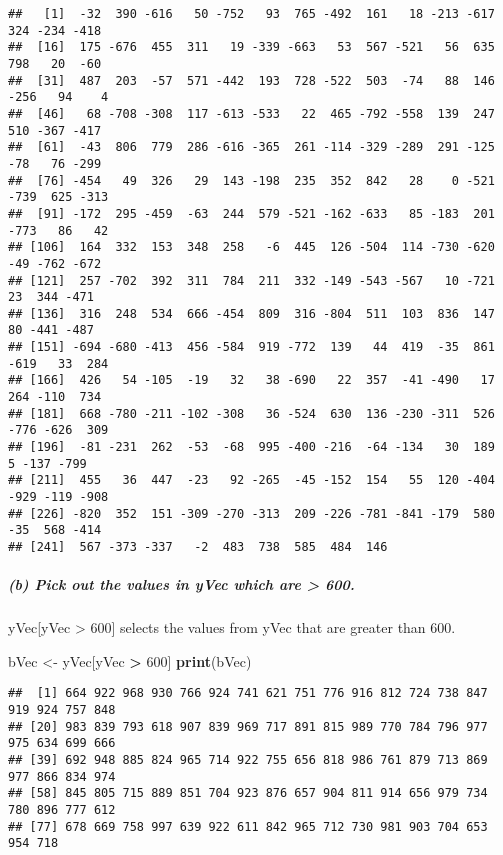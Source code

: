 \documentclass[
]{article}
\newenvironment{Shaded}{\begin{snugshade}}{\end{snugshade}}
\newcommand{\DecValTok}[1]{\textcolor[rgb]{0.00,0.00,0.81}{#1}}
\newcommand{\FunctionTok}[1]{\textcolor[rgb]{0.13,0.29,0.53}{\textbf{#1}}}
\newcommand{\NormalTok}[1]{#1}
\newcommand{\OtherTok}[1]{\textcolor[rgb]{0.56,0.35,0.01}{#1}}
\newcommand{\SpecialCharTok}[1]{\textcolor[rgb]{0.81,0.36,0.00}{\textbf{#1}}}
\begin{document}
\begin{verbatim}
##   [1]  -32  390 -616   50 -752   93  765 -492  161   18 -213 -617  324 -234 -418
##  [16]  175 -676  455  311   19 -339 -663   53  567 -521   56  635  798   20  -60
##  [31]  487  203  -57  571 -442  193  728 -522  503  -74   88  146 -256   94    4
##  [46]   68 -708 -308  117 -613 -533   22  465 -792 -558  139  247  510 -367 -417
##  [61]  -43  806  779  286 -616 -365  261 -114 -329 -289  291 -125  -78   76 -299
##  [76] -454   49  326   29  143 -198  235  352  842   28    0 -521 -739  625 -313
##  [91] -172  295 -459  -63  244  579 -521 -162 -633   85 -183  201 -773   86   42
## [106]  164  332  153  348  258   -6  445  126 -504  114 -730 -620  -49 -762 -672
## [121]  257 -702  392  311  784  211  332 -149 -543 -567   10 -721   23  344 -471
## [136]  316  248  534  666 -454  809  316 -804  511  103  836  147   80 -441 -487
## [151] -694 -680 -413  456 -584  919 -772  139   44  419  -35  861 -619   33  284
## [166]  426   54 -105  -19   32   38 -690   22  357  -41 -490   17  264 -110  734
## [181]  668 -780 -211 -102 -308   36 -524  630  136 -230 -311  526 -776 -626  309
## [196]  -81 -231  262  -53  -68  995 -400 -216  -64 -134   30  189    5 -137 -799
## [211]  455   36  447  -23   92 -265  -45 -152  154   55  120 -404 -929 -119 -908
## [226] -820  352  151 -309 -270 -313  209 -226 -781 -841 -179  580  -35  568 -414
## [241]  567 -373 -337   -2  483  738  585  484  146
\end{verbatim}

\subparagraph{(b) Pick out the values in yVec which are \textgreater{}
600.}\label{b-pick-out-the-values-in-yvec-which-are-600.}

yVec{[}yVec \textgreater{} 600{]} selects the values from yVec that are
greater than 600.

\begin{Shaded}
\begin{Highlighting}[]
\NormalTok{bVec }\OtherTok{\textless{}{-}}\NormalTok{ yVec[yVec }\SpecialCharTok{\textgreater{}} \DecValTok{600}\NormalTok{]}
\FunctionTok{print}\NormalTok{(bVec)}
\end{Highlighting}
\end{Shaded}

\begin{verbatim}
##  [1] 664 922 968 930 766 924 741 621 751 776 916 812 724 738 847 919 924 757 848
## [20] 983 839 793 618 907 839 969 717 891 815 989 770 784 796 977 975 634 699 666
## [39] 692 948 885 824 965 714 922 755 656 818 986 761 879 713 869 977 866 834 974
## [58] 845 805 715 889 851 704 923 876 657 904 811 914 656 979 734 780 896 777 612
## [77] 678 669 758 997 639 922 611 842 965 712 730 981 903 704 653 954 718
\end{verbatim}
\end{document}
